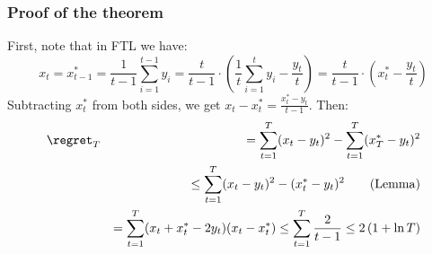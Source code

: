 \documentclass[handout]{beamer}
\begin{document}
\begin{frame}
\frametitle{Proof of the theorem}
First, note that in FTL we have:
\[
x_t = x^*_{t-1} = \frac{1}{t-1} \sum_{i=1}^{t-1} y_i = \frac{t}{t-1} \cdot \left(\frac{1}{t} \sum_{i=1}^{t} y_i - \frac{y_t}{t}\right) = \frac{t}{t-1} \cdot \left(x^*_t - \frac{y_t}{t}\right)
\]
Subtracting \(x^*_t\) from both sides, we get \(x_t - x^*_t = \frac{x^*_t - y_t}{t-1}\). Then:
    \begin{eqnarray*}
    	&\regret_T &= \sum_{t=1}^T (x_t-y_t)^2 - \sum_{t=1}^T (x^*_T-y_t)^2\\
	& &\le \sum_{t=1}^T  (x_t-y_t)^2 - (x^*_t-y_t)^2  \quad\quad (\mathrm{Lemma})\\
	& &= \sum_{t=1}^T (x_t + x^*_t - 2y_t)(x_t - x^*_t) \leq \sum_{t=1}^T \frac{2}{t-1} \leq 2\, (1 + \ln T)
     \end{eqnarray*}
\end{frame}
\end{document}
